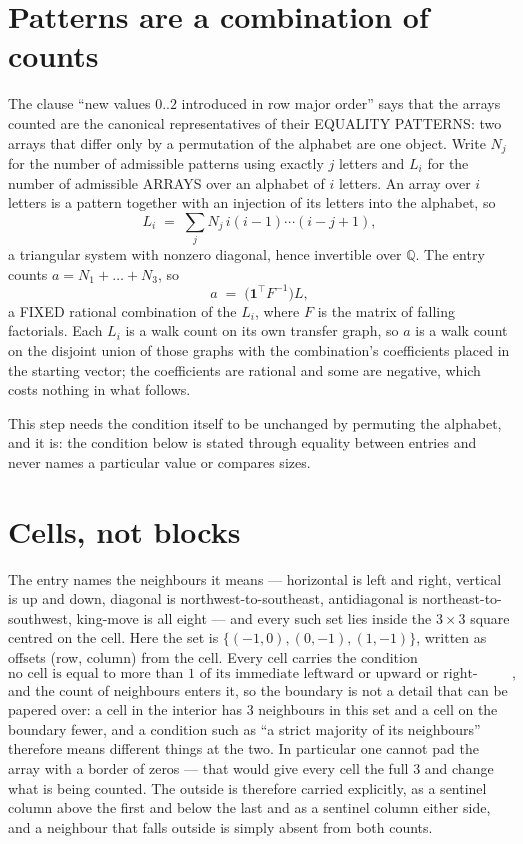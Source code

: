 \documentclass[11pt,a4paper]{article}
\theoremstyle{plain}
\theoremstyle{definition}
\begin{document}
\section{Patterns are a combination of counts}

The clause ``new values $0..2$ introduced in row major order'' says that the arrays
counted are the canonical representatives of their EQUALITY PATTERNS: two arrays that differ
only by a permutation of the alphabet are one object. Write $N_j$ for the number of admissible
patterns using exactly $j$ letters and $L_i$ for the number of admissible ARRAYS over an
alphabet of $i$ letters. An array over $i$ letters is a pattern together with an injection of
its letters into the alphabet, so
\[
L_i\;=\;\sum_{j}N_j\,i(i-1)\cdots(i-j+1),
\]
a triangular system with nonzero diagonal, hence invertible over $\mathbb{Q}$. The entry
counts $a=N_1+\dots+N_{3}$, so
\[
a\;=\;\bigl(\mathbf{1}^{\!\top}F^{-1}\bigr)L ,
\]
a FIXED rational combination of the $L_i$, where $F$ is the matrix of falling factorials.
Each $L_i$ is a walk count on its own transfer graph, so $a$ is a walk count on the disjoint
union of those graphs with the combination's coefficients placed in the starting vector; the
coefficients are rational and some are negative, which costs nothing in what follows.

This step needs the condition itself to be unchanged by permuting the alphabet, and it is:
the condition below is stated through equality between entries and never names a particular
value or compares sizes.

\section{Cells, not blocks}

The entry names the neighbours it means --- horizontal is left and right, vertical is up and
down, diagonal is northwest-to-southeast, antidiagonal is northeast-to-southwest, king-move is
all eight --- and every such set lies inside the $3\times3$ square centred on the cell. Here
the set is $\{(-1,0), (0,-1), (1,-1)\}$, written as offsets (row, column) from the cell. Every cell carries
the condition
\[
\text{no cell is equal to more than 1 of its immediate leftward or upward or right-upward antidiagonal neighbours},
\]
and the count of neighbours enters it, so the boundary is not a detail that can be papered
over: a cell in the interior has $3$ neighbours in this set and a cell on the boundary
fewer, and a condition such as ``a strict majority of its neighbours'' therefore means
different things at the two. In particular one cannot pad the array with a border of zeros ---
that would give every cell the full $3$ and change what is being counted. The outside is
therefore carried
explicitly, as a sentinel column above the first and below the last and as a sentinel column
either side, and a neighbour that falls outside is simply absent from both counts.
\end{document}
